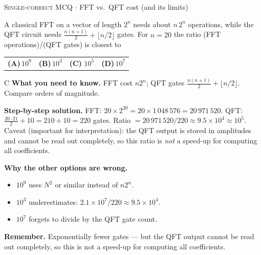 \documentclass[11pt,a4paper]{article}
\newcommand{\optlabel}[1]{\textbf{(#1)}}
\newcommand{\correctlabel}[1]{\textcolor{okgreen}{\textbf{(#1)}\,\ding{51}}}
\newenvironment{qitem}[1]{\begin{list}{}{\setlength{\leftmargin}{3.3em}\setlength{\labelwidth}{3.1em}%
  \setlength{\labelsep}{0.2em}\setlength{\topsep}{3pt}\setlength{\parsep}{3pt}}\item[\textbf{Q.#1}\hfill]}{\end{list}}
\newcommand{\qsep}{\par\vspace{2pt}{\color{black!15}\hrule}\vspace{4pt}}
\newcommand{\qmeta}[2]{{\footnotesize\color{black!60}\textsc{#1} \;$\cdot$\; #2}\par}
\begin{document}
\begin{qitem}{11}
\qmeta{Single-correct MCQ}{FFT vs.\ QFT cost (and its limits)}
A classical FFT on a vector of length $2^n$ needs about $n\,2^n$ operations, while the QFT circuit needs
$\frac{n(n+1)}{2} + \lfloor n/2\rfloor$ gates. For $n = 20$ the ratio (FFT operations)/(QFT gates) is closest to
\par\smallskip\noindent\begin{tabularx}{\linewidth}{@{}*{4}{L}@{}}
\optlabel{A}\,$10^{9}$ & \optlabel{B}\,$10^{3}$ & \correctlabel{C}\,$10^{5}$ & \optlabel{D}\,$10^{7}$
\end{tabularx}
\end{qitem}
\begin{solbox}{C}
\textbf{\color{brand}What you need to know.} FFT cost $n2^n$; QFT gates $\frac{n(n+1)}{2} + \lfloor n/2\rfloor$. Compare orders of magnitude.

\textbf{\color{brand}Step-by-step solution.} FFT: $20 \times 2^{20} = 20 \times 1\,048\,576 = 20\,971\,520$. QFT: $\frac{20\cdot21}{2} + 10 = 210 + 10 = 220$ gates.
Ratio $= 20\,971\,520 / 220 \approx 9.5 \times 10^{4} \approx 10^5$. Caveat (important for interpretation): the QFT output is
stored in amplitudes and cannot be read out completely, so this ratio is \emph{not} a speed-up for computing all coefficients.

\textbf{\color{brand}Why the other options are wrong.}
\begin{itemize}[leftmargin=2.4em, itemsep=1pt, topsep=2pt]
\item[\textbf{(A)}] $10^9$ uses $N^2$ or similar instead of $n2^n$.
\item[\textbf{(B)}] $10^3$ underestimates: $2.1\times10^7/220 \approx 9.5\times10^4$.
\item[\textbf{(D)}] $10^7$ forgets to divide by the QFT gate count.
\end{itemize}
\textbf{\color{brand}Remember.} Exponentially fewer gates --- but the QFT output cannot be read out completely, so this is not a speed-up for computing all coefficients.
\end{solbox}
\qsep
\end{document}
